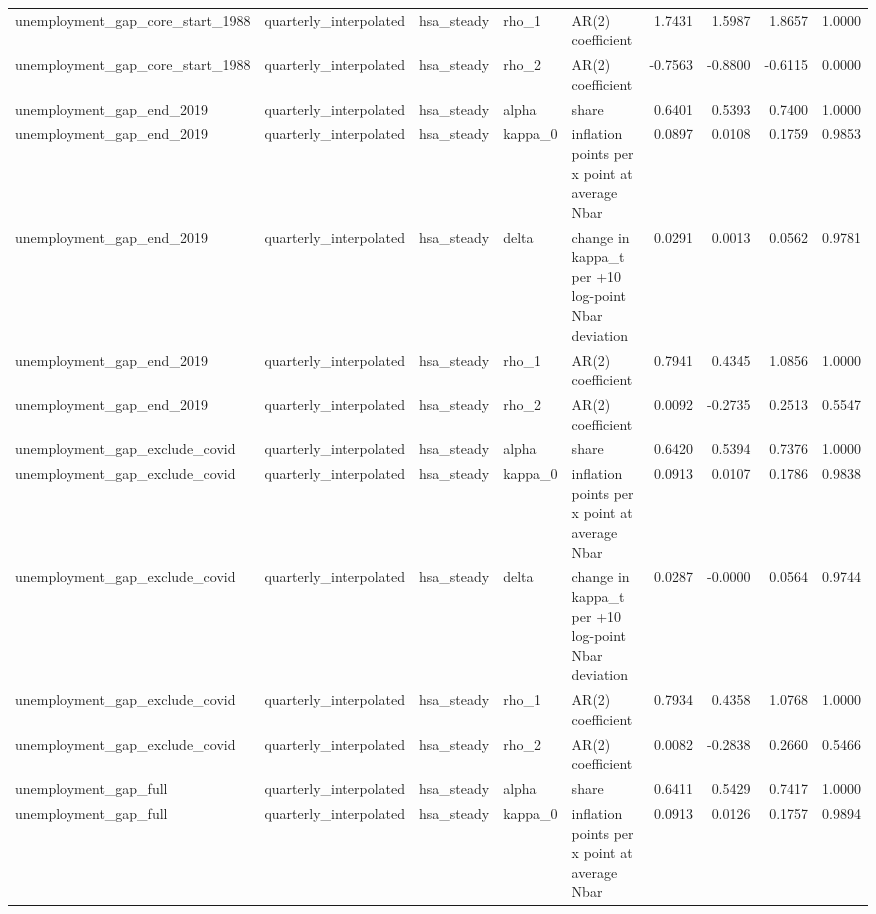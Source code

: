 \begin{tabular}{lllllrrrr}
unemployment\_gap\_core\_start\_1988 & quarterly\_interpolated & hsa\_steady & rho\_1 & AR(2) coefficient & 1.7431 & 1.5987 & 1.8657 & 1.0000 \\
unemployment\_gap\_core\_start\_1988 & quarterly\_interpolated & hsa\_steady & rho\_2 & AR(2) coefficient & -0.7563 & -0.8800 & -0.6115 & 0.0000 \\
unemployment\_gap\_end\_2019 & quarterly\_interpolated & hsa\_steady & alpha & share & 0.6401 & 0.5393 & 0.7400 & 1.0000 \\
unemployment\_gap\_end\_2019 & quarterly\_interpolated & hsa\_steady & kappa\_0 & inflation points per x point at average Nbar & 0.0897 & 0.0108 & 0.1759 & 0.9853 \\
unemployment\_gap\_end\_2019 & quarterly\_interpolated & hsa\_steady & delta & change in kappa\_t per +10 log-point Nbar deviation & 0.0291 & 0.0013 & 0.0562 & 0.9781 \\
unemployment\_gap\_end\_2019 & quarterly\_interpolated & hsa\_steady & rho\_1 & AR(2) coefficient & 0.7941 & 0.4345 & 1.0856 & 1.0000 \\
unemployment\_gap\_end\_2019 & quarterly\_interpolated & hsa\_steady & rho\_2 & AR(2) coefficient & 0.0092 & -0.2735 & 0.2513 & 0.5547 \\
unemployment\_gap\_exclude\_covid & quarterly\_interpolated & hsa\_steady & alpha & share & 0.6420 & 0.5394 & 0.7376 & 1.0000 \\
unemployment\_gap\_exclude\_covid & quarterly\_interpolated & hsa\_steady & kappa\_0 & inflation points per x point at average Nbar & 0.0913 & 0.0107 & 0.1786 & 0.9838 \\
unemployment\_gap\_exclude\_covid & quarterly\_interpolated & hsa\_steady & delta & change in kappa\_t per +10 log-point Nbar deviation & 0.0287 & -0.0000 & 0.0564 & 0.9744 \\
unemployment\_gap\_exclude\_covid & quarterly\_interpolated & hsa\_steady & rho\_1 & AR(2) coefficient & 0.7934 & 0.4358 & 1.0768 & 1.0000 \\
unemployment\_gap\_exclude\_covid & quarterly\_interpolated & hsa\_steady & rho\_2 & AR(2) coefficient & 0.0082 & -0.2838 & 0.2660 & 0.5466 \\
unemployment\_gap\_full & quarterly\_interpolated & hsa\_steady & alpha & share & 0.6411 & 0.5429 & 0.7417 & 1.0000 \\
unemployment\_gap\_full & quarterly\_interpolated & hsa\_steady & kappa\_0 & inflation points per x point at average Nbar & 0.0913 & 0.0126 & 0.1757 & 0.9894 \\

\end{tabular}
